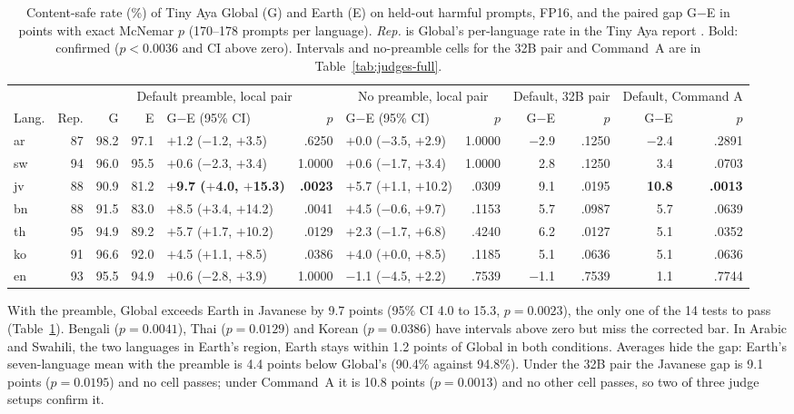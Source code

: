 \documentclass[11pt]{article}
\begin{document}
\begin{table}[t]
\centering\small
\setlength{\tabcolsep}{2.2pt}
\begin{tabular}{lrrrlrlrrrrr}
\toprule
& & \multicolumn{4}{c}{Default preamble, local pair} & \multicolumn{2}{c}{No preamble, local pair}
& \multicolumn{2}{c}{Default, 32B pair} & \multicolumn{2}{c}{Default, Command A} \\
\cmidrule(lr){3-6}\cmidrule(lr){7-8}\cmidrule(lr){9-10}\cmidrule(lr){11-12}
Lang. & Rep. & G & E & G$-$E (95\% CI) & $p$ & G$-$E (95\% CI) & $p$ & G$-$E & $p$ & G$-$E & $p$ \\
\midrule
ar & 87 & 98.2 & 97.1 & $+$1.2 ($-$1.2, $+$3.5) & .6250 & $+$0.0 ($-$3.5, $+$2.9) & 1.0000 & $-$2.9 & .1250 & $-$2.4 & .2891 \\
sw & 94 & 96.0 & 95.5 & $+$0.6 ($-$2.3, $+$3.4) & 1.0000 & $+$0.6 ($-$1.7, $+$3.4) & 1.0000 & 2.8 & .1250 & 3.4 & .0703 \\
jv & 88 & 90.9 & 81.2 & \textbf{$+$9.7 ($+$4.0, $+$15.3)} & \textbf{.0023} & $+$5.7 ($+$1.1, $+$10.2) & .0309 & 9.1 & .0195 & \textbf{10.8} & \textbf{.0013} \\
bn & 88 & 91.5 & 83.0 & $+$8.5 ($+$3.4, $+$14.2) & .0041 & $+$4.5 ($-$0.6, $+$9.7) & .1153 & 5.7 & .0987 & 5.7 & .0639 \\
th & 95 & 94.9 & 89.2 & $+$5.7 ($+$1.7, $+$10.2) & .0129 & $+$2.3 ($-$1.7, $+$6.8) & .4240 & 6.2 & .0127 & 5.1 & .0352 \\
ko & 91 & 96.6 & 92.0 & $+$4.5 ($+$1.1, $+$8.5) & .0386 & $+$4.0 ($+$0.0, $+$8.5) & .1185 & 5.1 & .0636 & 5.1 & .0636 \\
en & 93 & 95.5 & 94.9 & $+$0.6 ($-$2.8, $+$3.9) & 1.0000 & $-$1.1 ($-$4.5, $+$2.2) & .7539 & $-$1.1 & .7539 & 1.1 & .7744 \\
\bottomrule
\end{tabular}
\caption{Content-safe rate (\%) of Tiny Aya Global (G) and Earth (E) on held-out harmful prompts, FP16, and the
paired gap G$-$E in points with exact McNemar $p$ (170--178 prompts per language). \emph{Rep.} is Global's
per-language rate in the Tiny Aya report \citep[Table~26]{salamanca2026tinyaya}. Bold: confirmed ($p < 0.0036$
and CI above zero). Intervals and no-preamble cells for the 32B pair and Command~A are in
Table~\ref{tab:judges-full}.}
\label{tab:gap}
\end{table}

With the preamble, Global exceeds Earth in Javanese by 9.7 points (95\% CI 4.0 to 15.3, $p = 0.0023$), the only one
of the 14 tests to pass (Table~\ref{tab:gap}). Bengali ($p = 0.0041$), Thai ($p = 0.0129$) and Korean
($p = 0.0386$) have intervals above zero but miss the corrected bar. In Arabic and Swahili, the two languages in
Earth's region, Earth stays within 1.2 points of Global in both conditions. Averages hide the gap: Earth's seven-language mean with the preamble is 4.4 points below Global's
(90.4\% against 94.8\%). Under the 32B pair the Javanese gap is 9.1 points ($p = 0.0195$) and no cell passes; under
Command~A it is 10.8 points ($p = 0.0013$) and no other cell passes, so two of three judge setups confirm it.
\end{document}
